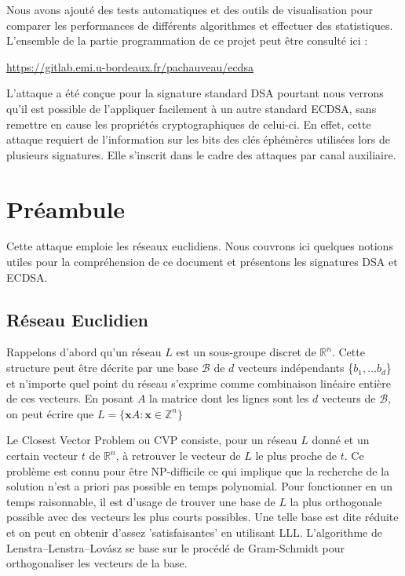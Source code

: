 \documentclass{backend}
\begin{document}
Nous avons ajouté des tests automatiques et des outils de visualisation pour comparer les performances de différents algorithmes et effectuer des statistiques. L'ensemble de la partie programmation de ce projet peut être consulté ici :
\begin{center}
    \url{https://gitlab.emi.u-bordeaux.fr/pachauveau/ecdsa}
\end{center}

L'attaque a été conçue pour la signature standard DSA pourtant nous verrons qu'il est possible de l'appliquer facilement à un autre standard ECDSA, sans remettre en cause les propriétés cryptographiques de celui-ci. En effet, cette attaque requiert de l'information sur les bits des clés éphémères utilisées lors de plusieurs signatures. Elle s'inscrit dans le cadre des attaques par canal auxiliaire.


\section{Préambule} \label{sec:preambule}

Cette attaque emploie les réseaux euclidiens. Nous couvrons ici quelques notions utiles pour la compréhension de ce document et présentons les signatures DSA et ECDSA.

\subsection{Réseau Euclidien}

Rappelons d'abord qu'un réseau $L$ est un sous-groupe discret de $\mathbb{R}^n$. Cette structure peut être décrite par une base $\mathcal{B}$ de $d$ vecteurs indépendants \{$b_1, \dots b_d$\} et n'importe quel point du réseau s'exprime comme combinaison linéaire entière de ces vecteurs. En posant $A$ la matrice dont les lignes sont les $d$ vecteurs de $\mathcal{B}$, on peut écrire que $L = \{\mathbf{x}A : \mathbf{x} \in \mathbb{Z}^n\}$\smallbreak

Le Closest Vector Problem ou CVP consiste, pour un réseau $L$ donné et un certain vecteur $t$ de $\mathbb{R}^n$, à retrouver le vecteur de $L$ le plus proche de $t$. Ce problème est connu pour être NP-difficile ce qui implique que la recherche de la solution n'est a priori pas possible en temps polynomial. Pour fonctionner en un temps raisonnable, il est d'usage de trouver une base de $L$ la plus orthogonale possible avec des vecteurs les plus courts possibles. Une telle base est dite réduite et on peut en obtenir d'assez 'satisfaisantes' en utilisant LLL. L'algorithme de Lenstra–Lenstra–Lovász \cite{lll} se base sur le procédé de Gram-Schmidt pour orthogonaliser les vecteurs de la base.\smallbreak
\end{document}
